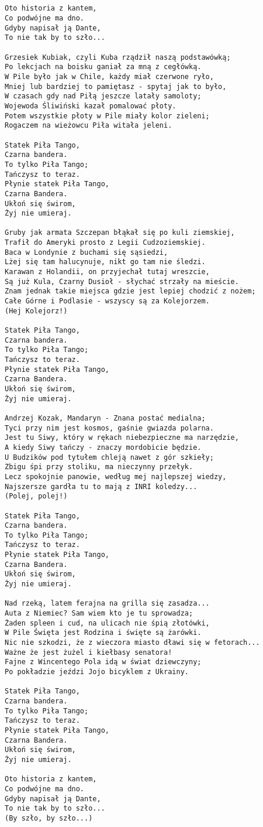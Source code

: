 \documentclass[12pt]{article}
\begin{document}
\subsection*{}
\begin{verbatim}
Oto historia z kantem,
Co podwójne ma dno.
Gdyby napisał ją Dante,
To nie tak by to szło...

Grzesiek Kubiak, czyli Kuba rządził naszą podstawówką;
Po lekcjach na boisku ganiał za mną z cegłówką.
W Pile było jak w Chile, każdy miał czerwone ryło,
Mniej lub bardziej to pamiętasz - spytaj jak to było,
W czasach gdy nad Piłą jeszcze latały samoloty;
Wojewoda Śliwiński kazał pomalować płoty.
Potem wszystkie płoty w Pile miały kolor zieleni;
Rogaczem na wieżowcu Piła witała jeleni.

Statek Piła Tango,
Czarna bandera.
To tylko Piła Tango;
Tańczysz to teraz.
Płynie statek Piła Tango,
Czarna Bandera.
Ukłoń się świrom,
Żyj nie umieraj.

Gruby jak armata Szczepan błąkał się po kuli ziemskiej,
Trafił do Ameryki prosto z Legii Cudzoziemskiej.
Baca w Londynie z buchami się sąsiedzi,
Lżej się tam halucynuje, nikt go tam nie śledzi.
Karawan z Holandii, on przyjechał tutaj wreszcie,
Są już Kula, Czarny Dusioł - słychać strzały na mieście.
Znam jednak takie miejsca gdzie jest lepiej chodzić z nożem;
Całe Górne i Podlasie - wszyscy są za Kolejorzem.
(Hej Kolejorz!)

Statek Piła Tango,
Czarna bandera.
To tylko Piła Tango;
Tańczysz to teraz.
Płynie statek Piła Tango,
Czarna Bandera.
Ukłoń się świrom,
Żyj nie umieraj.

Andrzej Kozak, Mandaryn - Znana postać medialna;
Tyci przy nim jest kosmos, gaśnie gwiazda polarna.
Jest tu Siwy, który w rękach niebezpieczne ma narzędzie,
A kiedy Siwy tańczy - znaczy mordobicie będzie.
U Budzików pod tytułem chleją nawet z gór szkieły;
Zbigu śpi przy stoliku, ma nieczynny przełyk.
Lecz spokojnie panowie, według mej najlepszej wiedzy,
Najszersze gardła tu to mają z INRI koledzy...
(Polej, polej!)

Statek Piła Tango,
Czarna bandera.
To tylko Piła Tango;
Tańczysz to teraz.
Płynie statek Piła Tango,
Czarna Bandera.
Ukłoń się świrom,
Żyj nie umieraj.

Nad rzeką, latem ferajna na grilla się zasadza...
Auta z Niemiec? Sam wiem kto je tu sprowadza;
Żaden spleen i cud, na ulicach nie śpią złotówki,
W Pile Święta jest Rodzina i święte są żarówki.
Nic nie szkodzi, że z wieczora miasto dławi się w fetorach...
Ważne że jest żużel i kiełbasy senatora!
Fajne z Wincentego Pola idą w świat dziewczyny;
Po pokładzie jeździ Jojo bicyklem z Ukrainy.

Statek Piła Tango,
Czarna bandera.
To tylko Piła Tango;
Tańczysz to teraz.
Płynie statek Piła Tango,
Czarna Bandera.
Ukłoń się świrom,
Żyj nie umieraj.

Oto historia z kantem,
Co podwójne ma dno.
Gdyby napisał ją Dante,
To nie tak by to szło...
(By szło, by szło...)
\end{verbatim}
\clearpage
\end{document}
